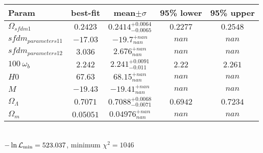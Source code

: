 \begin{tabular}{|l|c|c|c|c|} 
 \hline 
Param & best-fit & mean$\pm\sigma$ & 95\% lower & 95\% upper \\ \hline 
$\Omega_{sfdm 1 }$ &$0.2423$ & $0.2414_{-0.0065}^{+0.0064}$ & $0.2277$ & $0.2548$ \\ 
$sfdm_{parameters 1  1 }$ &$-17.03$ & $-19.7_{nan}^{+nan}$ & $nan$ & $nan$ \\ 
$sfdm_{parameters 1  2 }$ &$3.036$ & $2.676_{nan}^{+nan}$ & $nan$ & $nan$ \\ 
$100~\omega_{b }$ &$2.242$ & $2.241_{-0.011}^{+0.0091}$ & $2.22$ & $2.261$ \\ 
$H0$ &$67.63$ & $68.15_{nan}^{+nan}$ & $nan$ & $nan$ \\ 
$M$ &$-19.43$ & $-19.41_{nan}^{+nan}$ & $nan$ & $nan$ \\ 
$\Omega_{\Lambda }$ &$0.7071$ & $0.7088_{-0.0071}^{+0.0068}$ & $0.6942$ & $0.7234$ \\ 
$\Omega_{m }$ &$0.05051$ & $0.04976_{nan}^{+nan}$ & $nan$ & $nan$ \\ 
\hline 
 \end{tabular} \\ 
$-\ln{\cal L}_\mathrm{min} =523.037$, minimum $\chi^2=1046$ \\ 
